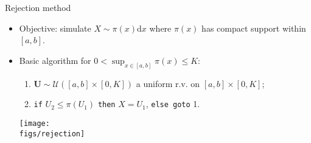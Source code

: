 \documentclass{beamer}
\newcommand{\id}{\mathrm{d}}
\newcommand{\Ugj}{U}
\newcommand{\Ug}{{\boldsymbol\Ugj}}
\newcommand{\PDFU}{{\mathcal U}}
\begin{document}
\begin{frame}{Rejection method}

\begin{itemize}
\item Objective: simulate $X\sim\pi(x)\id x$ where $\pi(x)$ has compact support within $[a,b]$.
\vspace{0.3truecm}
\item Basic algorithm for $0<\sup_{x\in[a,b]}\pi(x)\leq K$:
\begin{enumerate}
\item $\Ug\sim\PDFU([a,b]\times[0,K])$ a uniform r.v. on $[a,b]\times[0,K]$;
\item \texttt{if} $U_2\leq\pi(U_1)$ \texttt{then} $X=U_1$, \texttt{else goto} 1.
\end{enumerate}
\centering\texttt{[image: \\figs/rejection]}
\end{itemize}

\end{frame}
\end{document}
